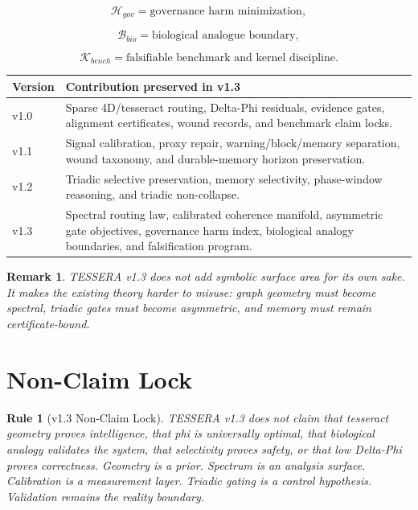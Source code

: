 \documentclass[12pt]{article}
\newtheorem{rulebox}{Rule}
\newtheorem{remark}{Remark}
\begin{document}
\[
\mathcal{H}_{gov}=\text{governance harm minimization},
\]

\[
\mathcal{B}_{bio}=\text{biological analogue boundary},
\]

\[
\mathcal{K}_{bench}=\text{falsifiable benchmark and kernel discipline}.
\]

\begin{longtable}{p{}p{}}
\toprule
\textbf{Version} & \textbf{Contribution preserved in v1.3} \\
\midrule
v1.0 & Sparse 4D/tesseract routing, Delta-Phi residuals, evidence gates,
alignment certificates, wound records, and benchmark claim locks. \\
v1.1 & Signal calibration, proxy repair, warning/block/memory separation,
wound taxonomy, and durable-memory horizon preservation. \\
v1.2 & Triadic selective preservation, memory selectivity, phase-window
reasoning, and triadic non-collapse. \\
v1.3 & Spectral routing law, calibrated coherence manifold, asymmetric gate
objectives, governance harm index, biological analogy boundaries, and
falsification program. \\
\bottomrule
\end{longtable}

\begin{remark}
TESSERA v1.3 does not add symbolic surface area for its own sake. It makes the
existing theory harder to misuse: graph geometry must become spectral, triadic
gates must become asymmetric, and memory must remain certificate-bound.
\end{remark}

\section{Non-Claim Lock}

\begin{rulebox}[v1.3 Non-Claim Lock]
TESSERA v1.3 does not claim that tesseract geometry proves intelligence, that
phi is universally optimal, that biological analogy validates the system, that
selectivity proves safety, or that low Delta-Phi proves correctness. Geometry is
a prior. Spectrum is an analysis surface. Calibration is a measurement layer.
Triadic gating is a control hypothesis. Validation remains the reality boundary.
\end{rulebox}
\end{document}
